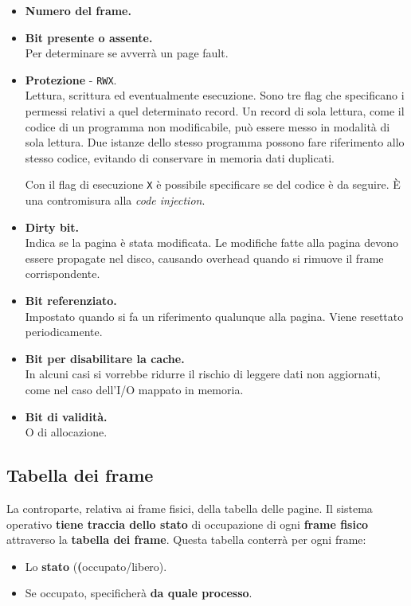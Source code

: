 \documentclass{report}
\begin{document}
\begin{itemize}
    \item \textbf{Numero del frame.}
    \item \textbf{Bit presente o assente.}\\
    Per determinare se avverrà un page fault.
    \item \textbf{Protezione} - \verb|RWX|.\\
    Lettura, scrittura ed eventualmente esecuzione. Sono tre flag che specificano i permessi relativi a quel determinato record. Un record di sola lettura, come il codice di un programma non modificabile, può essere messo in modalità di sola lettura. Due istanze dello stesso programma possono fare riferimento allo stesso codice, evitando di conservare in memoria dati duplicati.
    
    Con il flag di esecuzione \verb|X| è possibile specificare se del codice è da seguire. È una contromisura alla \textit{code injection}.
    \item \textbf{Dirty bit.}\\
    Indica se la pagina è stata modificata. Le modifiche fatte alla pagina devono essere propagate nel disco, causando overhead quando si rimuove il frame corrispondente.
    \item \textbf{Bit referenziato.}\\
    Impostato quando si fa un riferimento qualunque alla pagina. Viene resettato periodicamente.
    \item \textbf{Bit per disabilitare la cache.}\\
    In alcuni casi si vorrebbe ridurre il rischio di leggere dati non aggiornati, come nel caso dell'I/O mappato in memoria.
    \item \textbf{Bit di validità.}\\
    O di allocazione.
\end{itemize}

\subsection{Tabella dei frame}
La controparte, relativa ai frame fisici, della tabella delle pagine.
Il sistema operativo \textbf{tiene traccia dello stato} di occupazione di ogni \textbf{frame fisico} attraverso la \textbf{tabella dei frame}.
Questa tabella conterrà per ogni frame:

\begin{itemize}
    \item Lo \textbf{stato} (\textbf({occupato/libero}).
    \item Se occupato, specificherà \textbf{da quale processo}.
\end{itemize}
\end{document}
